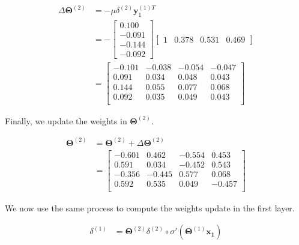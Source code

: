 \documentclass[a4paper, 10pt, twoside]{article}
\begin{document}
\begin{enumerate}[a)]
	      \begin{align*}
		      \Delta\bm{\Theta}^{(2)}
		       & = - \mu \delta^{(2)} \bm{y}_1^{(1)T} \\
		       & = -
		      \begin{bmatrix}
			      0.100 \\ -0.091 \\ -0.144 \\ -0.092
		      \end{bmatrix}
		      \begin{bmatrix}
			      1 & 0.378 & 0.531 & 0.469
		      \end{bmatrix}              \\
		       & =
		      \begin{bmatrix}
			      -0.101 & -0.038 & -0.054 & -0.047 \\
			      0.091  & 0.034  & 0.048  & 0.043  \\
			      0.144  & 0.055  & 0.077  & 0.068  \\
			      0.092  & 0.035  & 0.049  & 0.043  \\
		      \end{bmatrix}
	      \end{align*}

	      Finally, we update the weights in $\bm{\Theta}^{(2)}$.

	      \begin{align*}
		      \bm{\Theta}^{(2)} & = \bm{\Theta}^{(2)} + \Delta\bm{\Theta}^{(2)} \\
		                        & =
		      \begin{bmatrix}
			      -0.601 & 0.462  & -0.554 & 0.453  \\
			      0.591  & 0.034  & -0.452 & 0.543  \\
			      -0.356 & -0.445 & 0.577  & 0.068  \\
			      0.592  & 0.535  & 0.049  & -0.457 \\
              \end{bmatrix}
          \end{align*}
          
          We now use the same process to compute the weights update in the first layer.

          \begin{align*}
              \delta^{(1)} &= \bm{\Theta}^{(2)} \delta^{(2)} \circ \sigma' \left(\bm{\Theta}^{(1)} \bm{x_1} \right)\\
          \end{align*}
\end{enumerate}
\end{document}
